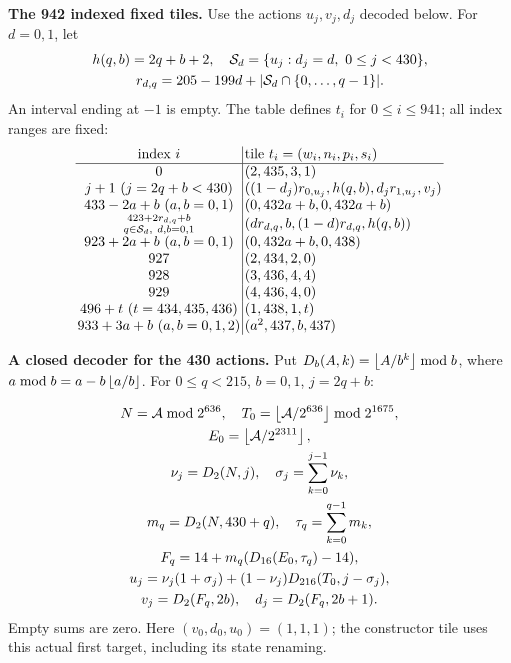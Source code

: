 \textbf{The 942 indexed fixed tiles.}
Use the actions $u_j,v_j,d_j$ decoded below. For $d=0,1$, let
\[
\begin{gathered}
h(q,b)=2q+b+2,\quad
\mathcal S_d=\{u_j:d_j=d,\ 0\le j<430\},\\
r_{d,q}=205-199d+|\mathcal S_d\cap\{0,\ldots,q-1\}|.
\end{gathered}
\]
An interval ending at $-1$ is empty. The table defines $t_i$ for
$0\le i\le941$; all index ranges are fixed:
\[
\setlength{\arraycolsep}{1.4pt}\begin{array}{c|l}
\text{index }i&\text{tile }t_i=(w_i,n_i,p_i,s_i)\\\hline
0&(2,435,3,1)\\
j+1\ (j=2q+b<430)&((1-d_j)r_{0,u_j},h(q,b),d_jr_{1,u_j},v_j)\\
433-2a+b\ (a,b=0,1)&(0,432a+b,0,432a+b)\\
\substack{423+2r_{d,q}+b\\q\in\mathcal S_d,\ d,b=0,1}&(dr_{d,q},b,(1-d)r_{d,q},h(q,b))\\
923+2a+b\ (a,b=0,1)&(0,432a+b,0,438)\\
927&(2,434,2,0)\\
928&(3,436,4,4)\\
929&(4,436,4,0)\\
496+t\ (t=434,435,436)&(1,438,1,t)\\
933+3a+b\ (a,b=0,1,2)&(a^2,437,b,437)
\end{array}
\]
\begin{samepage}
\textbf{A closed decoder for the 430 actions.}
Put $D_b(A,k)=\left\lfloor A/b^k\right\rfloor\bmod b$, where
$a\bmod b=a-b\left\lfloor a/b\right\rfloor$. For $0\le q<215$, $b=0,1$, $j=2q+b$:
\end{samepage}
\[
\begin{gathered}
N=\mathcal A\bmod2^{636},\quad
T_0=\left\lfloor\mathcal A/2^{636}\right\rfloor\bmod2^{1675},\\
E_0=\left\lfloor\mathcal A/2^{2311}\right\rfloor,\\
\nu_j=D_2(N,j),\quad \sigma_j=\sum_{k=0}^{j-1}\nu_k,\\
m_q=D_2(N,430+q),\quad \tau_q=\sum_{k=0}^{q-1}m_k,\\
F_q=14+m_q(D_{16}(E_0,\tau_q)-14),\\
u_j=\nu_j(1+\sigma_j)+(1-\nu_j)D_{216}(T_0,j-\sigma_j),\\
v_j=D_2(F_q,2b),\quad d_j=D_2(F_q,2b+1).
\end{gathered}
\]
Empty sums are zero. Here $(v_0,d_0,u_0)=(1,1,1)$; the constructor tile
uses this actual first target, including its state renaming.

